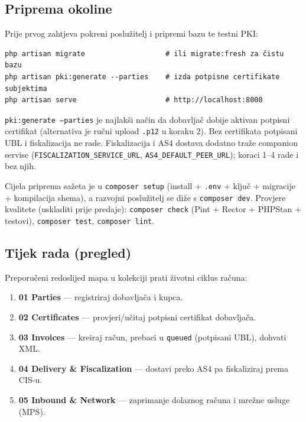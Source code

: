 \documentclass[11pt,a4paper]{article}
\renewenvironment{leftbar}{%
  \def\FrameCommand{\hspace{0pt}\vrule width 2pt\hspace{8pt}}%
  \MakeFramed{\advance\hsize-\width \FrameRestore}}%
 {\endMakeFramed}
\begin{document}
\subsection{Priprema okoline}

Prije prvog zahtjeva pokreni poslužitelj i pripremi bazu te testni PKI:

\begin{Verbatim}
php artisan migrate                   # ili migrate:fresh za čistu bazu
php artisan pki:generate --parties    # izda potpisne certifikate subjektima
php artisan serve                     # http://localhost:8000
\end{Verbatim}

\begin{leftbar}
\texttt{pki:generate --parties} je najlakši način da dobavljač dobije aktivan
potpisni certifikat (alternativa je ručni upload \texttt{.p12} u koraku 2). Bez
certifikata potpisani UBL i fiskalizacija ne rade. Fiskalizacija i AS4
dostava dodatno traže companion servise (\texttt{FISCALIZATION\_SERVICE\_URL},
\texttt{AS4\_DEFAULT\_PEER\_URL}); koraci 1–4 rade i bez njih.
\end{leftbar}

Cijela priprema sažeta je u \texttt{composer setup} (install + \texttt{.env} + ključ + migracije +
kompilacija shema), a razvojni poslužitelj se diže s \texttt{composer dev}. Provjere kvalitete
(uskladiti prije predaje): \texttt{composer check} (Pint + Rector + PHPStan + testovi),
\texttt{composer test}, \texttt{composer lint}.

\subsection{Tijek rada (pregled)}

Preporučeni redoslijed mapa u kolekciji prati životni ciklus računa:

\begin{enumerate}[nosep]
  \item \textbf{01 Parties} — registriraj dobavljača i kupca.
  \item \textbf{02 Certificates} — provjeri/učitaj potpisni certifikat dobavljača.
  \item \textbf{03 Invoices} — kreiraj račun, prebaci u \texttt{queued} (potpisani UBL), dohvati XML.
  \item \textbf{04 Delivery \& Fiscalization} — dostavi preko AS4 pa fiskaliziraj prema CIS-u.
  \item \textbf{05 Inbound \& Network} — zaprimanje dolaznog računa i mrežne usluge (MPS).
\end{enumerate}
\end{document}
